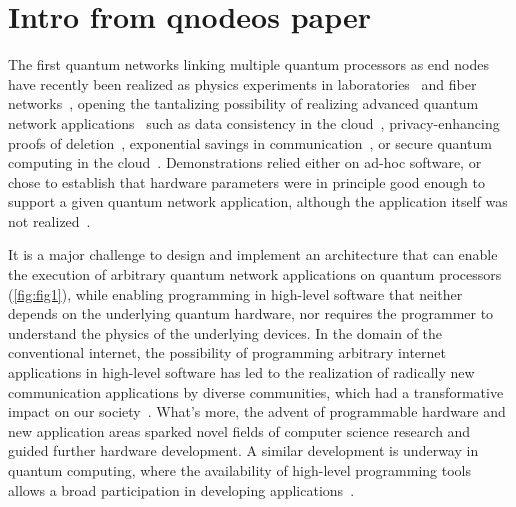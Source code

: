 \section{Intro from qnodeos paper}
The first quantum networks linking multiple quantum processors as end nodes have recently been realized as physics experiments in laboratories~\cite{moehring_2007_ion_traps,ritter_2012_elementary,hofmann_2012_heralded,stockill_2017_phasetuned,jing2019entanglement,stephenson_2020_highrate,pompili_2021_multinode,krutyanskiy_entanglement_2023} and fiber networks~\cite{liu2024creation,stolk2024metropolitan,knaut2024entanglement}, opening the tantalizing possibility of realizing advanced quantum network applications~\cite{wehner_2018_stages} such as data consistency in the cloud~\cite{benor_2005_byzantine}, privacy-enhancing proofs of deletion~\cite{poremba_quantum_2022}, exponential savings in communication~\cite{guerin_exponential_2016}, or secure quantum computing in the cloud~\cite{broadbent_2009_ubqc,childs_2005_secure_qc}. Demonstrations relied either on ad-hoc software, or chose to establish that hardware parameters were in principle good enough to support a given quantum network application, although the application itself was not realized~\cite{nadlinger_device-independent_2022,liu_2022_photonic_diqkd,zhang_2022_diqkd}.

It is a major challenge to design and implement an architecture that can enable the execution of arbitrary quantum network applications on quantum processors (\cref{fig:fig1}), while enabling programming in high-level software that neither depends on the underlying quantum hardware, nor requires the programmer to understand the physics of the underlying devices.  In the domain of the conventional internet, the possibility of programming arbitrary internet applications in high-level software has led to the realization of radically new communication applications by diverse communities, which had a transformative impact on our society~\cite{castells_impact_2013}. What's more, the advent of programmable hardware and new application areas sparked novel fields of computer science research and guided further hardware development.  A similar development is underway in quantum computing, where the availability of high-level programming tools allows a broad participation in developing applications~\cite{noauthor_quantum_2024}.



